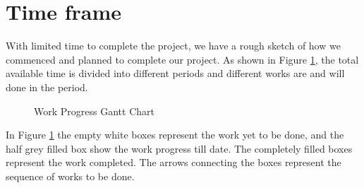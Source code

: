 \section{Time frame}
	With limited time to complete the project, we have a rough sketch of how we commenced and planned to complete our project. As shown in Figure \ref{fig:GanttChart}, the total available time is divided into different periods and different works are and will done in the period. 


	\begin{figure}[htbp]
		\centering
		
		\caption{Work Progress Gantt Chart }
		\label{fig:GanttChart}	
	\end{figure}

	In Figure \ref{fig:GanttChart} the empty white boxes represent the work yet to be done, and the half grey filled box show the work progress till date. The completely filled boxes represent the work completed. The arrows connecting the boxes represent the sequence of works to be done.
\newpage
